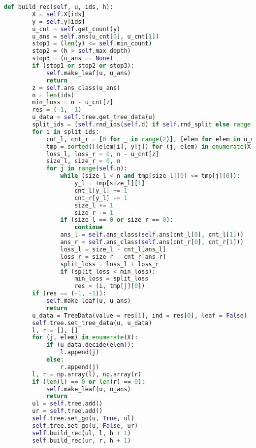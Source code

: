 \begin{lstlisting}[language=Python]
    def build_rec(self, u, ids, h):
        X = self.X[ids]
        y = self.y[ids]
        u_cnt = self.get_count(y)
        u_ans = self.ans(u_cnt[0], u_cnt[1])
        stop1 = (len(y) <= self.min_count)
        stop2 = (h > self.max_depth)
        stop3 = (u_ans == None)
        if (stop1 or stop2 or stop3):
            self.make_leaf(u, u_ans)
            return
        z = self.ans_class(u_ans)
        n = len(ids)
        min_loss = n - u_cnt[z]
        res = (-1, -1)
        u_data = self.tree.get_tree_data(u)
        split_ids = (self.rnd_ids(self.d) if self.rnd_split else range(self.d))
        for i in split_ids:
            cnt_l, cnt_r = [0 for _ in range(2)], [elem for elem in u_cnt]
            tmp = sorted([(elem[i], y[j]) for (j, elem) in enumerate(X)])
            loss_l, loss_r = 0, n - u_cnt[z]
            size_l, size_r = 0, n
            for j in range(self.n):
                while (size_l < n and tmp[size_l][0] <= tmp[j][0]):
                    y_l = tmp[size_l][1]
                    cnt_l[y_l] += 1
                    cnt_r[y_l] -= 1
                    size_l += 1
                    size_r -= 1
                if (size_l == 0 or size_r == 0):
                    continue
                ans_l = self.ans_class(self.ans(cnt_l[0], cnt_l[1]))
                ans_r = self.ans_class(self.ans(cnt_r[0], cnt_r[1]))
                loss_l = size_l - cnt_l[ans_l]
                loss_r = size_r - cnt_r[ans_r]
                split_loss = loss_l + loss_r
                if (split_loss < min_loss):
                    min_loss = split_loss
                    res = (i, tmp[j][0])
        if (res == (-1, -1)):
            self.make_leaf(u, u_ans)
            return
        u_data = TreeData(value = res[1], ind = res[0], leaf = False)
        self.tree.set_tree_data(u, u_data)
        l, r = [], []
        for (j, elem) in enumerate(X):
            if (u_data.decide(elem)):
                l.append(j)
            else:
                r.append(j)
        l, r = np.array(l), np.array(r)
        if (len(l) == 0 or len(r) == 0):
            self.make_leaf(u, u_ans)
            return
        ul = self.tree.add()
        ur = self.tree.add()
        self.tree.set_go(u, True, ul)
        self.tree.set_go(u, False, ur)
        self.build_rec(ul, l, h + 1)
        self.build_rec(ur, r, h + 1)
\end{lstlisting}
\pagebreak


